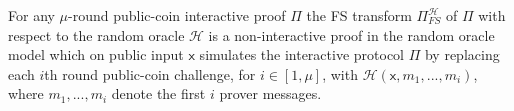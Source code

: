 

\begin{definition}[FS Transform]
For any $\mu$-round public-coin interactive proof $\Pi$ the FS transform $\Pi^{\mathcal{H}}_{FS}$ of $\Pi$ with respect to the random oracle $\mathcal{H}$ is a non-interactive proof in the random oracle model which on public input $\mathsf{x}$ simulates the interactive protocol $\Pi$ by replacing each $i$th round public-coin challenge, for $i \in [1, \mu]$, with $\mathcal{H}(\mathsf{x}, m_1,...,m_i)$, where $m_1,...,m_i$ denote the first $i$ prover messages. 
\end{definition}

